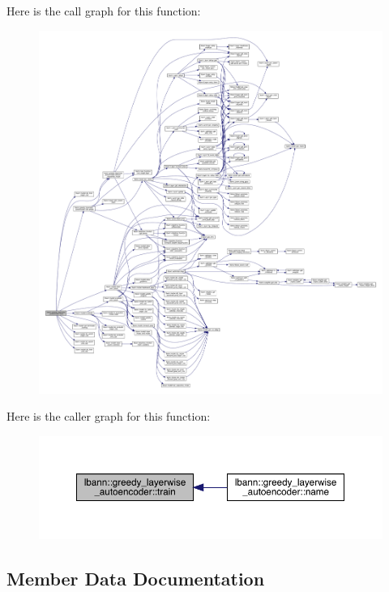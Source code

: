 Here is the call graph for this function\+:\nopagebreak
\begin{figure}[H]
\begin{center}
\leavevmode
\includegraphics[width=350pt]{classlbann_1_1greedy__layerwise__autoencoder_a085f0b2debb82d9c4927a1c8b11dd353_cgraph}
\end{center}
\end{figure}
Here is the caller graph for this function\+:\nopagebreak
\begin{figure}[H]
\begin{center}
\leavevmode
\includegraphics[width=350pt]{classlbann_1_1greedy__layerwise__autoencoder_a085f0b2debb82d9c4927a1c8b11dd353_icgraph}
\end{center}
\end{figure}


\subsection{Member Data Documentation}
\mbox{\label{classlbann_1_1greedy__layerwise__autoencoder_a792010a00136ee1e024b6e5d38c77386}} 
